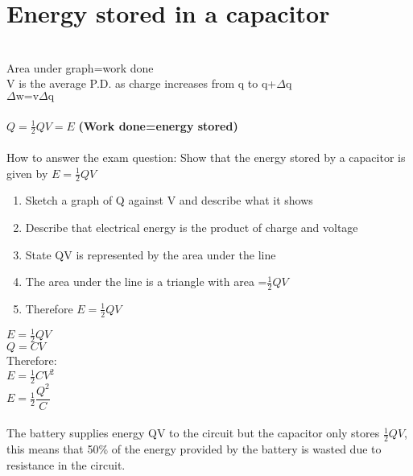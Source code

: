 \documentclass{article}[18pt]
\begin{document}
\section{Energy stored in a capacitor}
\\
Area under graph=work done\\
V is the average P.D. as charge increases from q to q+$\Delta$q\\
$\Delta \text{w=v}\Delta \text{q}$\\
\\
$Q=\frac{1}{2}QV=E$  \textbf{(Work done=energy stored)}\\
\\
How to answer the exam question: Show that the energy stored by a capacitor is given by $E=\frac{1}{2}QV$
\begin{enumerate}
\item Sketch a graph of Q against V and describe what it shows
\item Describe that electrical energy is the product of charge and voltage
\item State QV is represented by the area under the line
\item The area under the line is a triangle with area =$\frac{1}{2}QV$
\item Therefore $E=\frac{1}{2}QV$
\end{enumerate}
$E=\frac{1}{2}QV$\\
$Q=CV$\\
Therefore:\\
$E=\frac{1}{2}CV^2$\\
$E=\frac{1}{2}\dfrac{Q^2}{C}$\\
\\
The battery supplies energy QV to the circuit but the capacitor only stores $\frac{1}{2}QV$, this means that 50\% of the energy provided by the battery is wasted due to resistance in the circuit.
\end{document}
